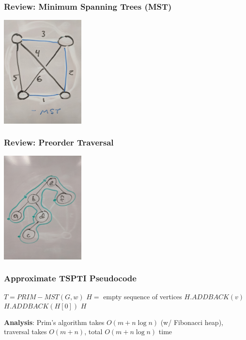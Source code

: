 \documentclass[10pt,aspectratio=169]{beamer}
\begin{document}
  \begin{frame} \frametitle{Review: Minimum Spanning Trees (MST)}
    \begin{center}
      \includegraphics[height=160pt]{13-mst.jpg}
    \end{center}
  \end{frame}
  
  \begin{frame} \frametitle{Review: Preorder Traversal}
    \begin{center}
      \includegraphics[height=160pt]{13-preorder.jpg}
    \end{center}
  \end{frame}
  
  \begin{frame} \frametitle{Approximate TSPTI Pseudocode}
    \begin{algorithmic}[1]
        \State $T = PRIM-MST(G, w)$
        \State $H = $ empty sequence of vertices
          \State $H.ADDBACK(v)$
        \EndFor
        \State $H.ADDBACK(H[0])$
        \State \Return $H$
      \EndFunction
    \end{algorithmic}
  \vspace{.5 cm}
  \textbf{Analysis}: Prim's algorithm takes $O(m + n \log n)$ (w/ Fibonacci heap),
  traversal takes $O(m + n)$, total $O(m + n \log n)$ time
  \end{frame}
  
\end{document}
